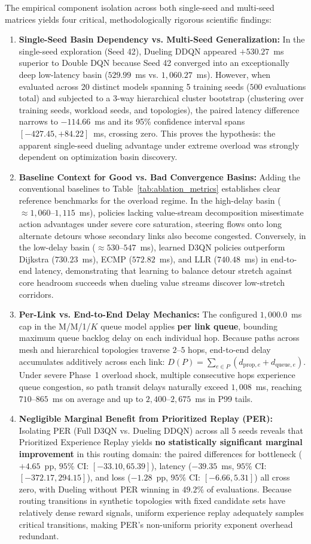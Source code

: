 \documentclass[12pt,a4paper,oneside]{report}
\begin{document}
The empirical component isolation across both single-seed and multi-seed matrices yields four critical, methodologically rigorous scientific findings:
\begin{enumerate}
  \item \textbf{Single-Seed Basin Dependency vs. Multi-Seed Generalization:} In the single-seed exploration (Seed 42), Dueling DDQN appeared $+530.27$~ms superior to Double DQN because Seed 42 converged into an exceptionally deep low-latency basin ($529.99$~ms vs. $1,060.27$~ms). However, when evaluated across 20 distinct models spanning 5 training seeds ($500$ evaluations total) and subjected to a 3-way hierarchical cluster bootstrap (clustering over training seeds, workload seeds, and topologies), the paired latency difference narrows to $-114.66$~ms and its 95\% confidence interval spans $[-427.45, +84.22]$~ms, crossing zero. This proves the hypothesis: the apparent single-seed dueling advantage under extreme overload was strongly dependent on optimization basin discovery.
  \item \textbf{Baseline Context for Good vs. Bad Convergence Basins:} Adding the conventional baselines to Table~\ref{tab:ablation_metrics} establishes clear reference benchmarks for the overload regime. In the high-delay basin ($\approx 1,060\text{--}1,115$~ms), policies lacking value-stream decomposition misestimate action advantages under severe core saturation, steering flows onto long alternate detours whose secondary links also become congested. Conversely, in the low-delay basin ($\approx 530\text{--}547$~ms), learned D3QN policies outperform Dijkstra ($730.23$~ms), ECMP ($572.82$~ms), and LLR ($740.48$~ms) in end-to-end latency, demonstrating that learning to balance detour stretch against core headroom succeeds when dueling value streams discover low-stretch corridors.
  \item \textbf{Per-Link vs. End-to-End Delay Mechanics:} The configured $1,000.0$~ms cap in the M/M/1/$K$ queue model applies \textbf{per link queue}, bounding maximum queue backlog delay on each individual hop. Because paths across mesh and hierarchical topologies traverse $2$--$5$ hops, end-to-end delay accumulates additively across each link: $D(P) = \sum_{e \in P} (d_{\mathrm{prop}, e} + d_{\mathrm{queue}, e})$. Under severe Phase~1 overload shock, multiple consecutive hops experience queue congestion, so path transit delays naturally exceed $1,008$~ms, reaching $710\text{--}865$~ms on average and up to $2,400\text{--}2,675$~ms in P99 tails.
  \item \textbf{Negligible Marginal Benefit from Prioritized Replay (PER):} Isolating PER (Full D3QN vs. Dueling DDQN) across all 5 seeds reveals that Prioritized Experience Replay yields \textbf{no statistically significant marginal improvement} in this routing domain: the paired differences for bottleneck ($+4.65$~pp, $95\%$ CI: $[-33.10, 65.39]$), latency ($-39.35$~ms, $95\%$ CI: $[-372.17, 294.15]$), and loss ($-1.28$~pp, $95\%$ CI: $[-6.66, 5.31]$) all cross zero, with Dueling without PER winning in $49.2\%$ of evaluations. Because routing transitions in synthetic topologies with fixed candidate sets have relatively dense reward signals, uniform experience replay adequately samples critical transitions, making PER's non-uniform priority exponent overhead redundant.

\end{enumerate}
\end{document}
